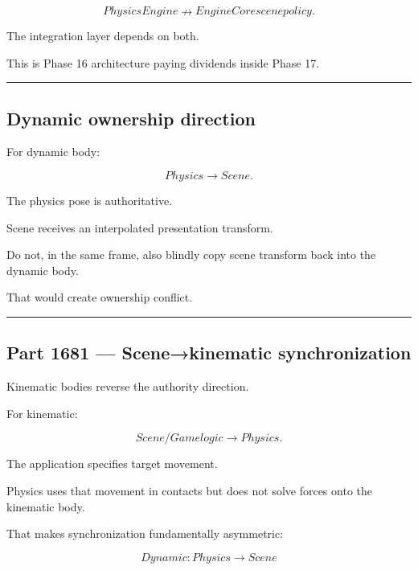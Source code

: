 \[
PhysicsEngine
\nrightarrow
EngineCore scene policy.
\]

The integration layer depends on both.

This is Phase 16 architecture paying dividends inside Phase 17.

\begin{center}\rule{0.5\linewidth}{0.5pt}\end{center}

\subsection{Dynamic ownership direction}\label{06-engine-ii-ch037-dynamic-ownership-direction}

\hypertarget{06-engine-ii-ch037-dynamic-ownership-direction}{}

For dynamic body:

\[
\boxed{
Physics\rightarrow Scene.
}
\]

The physics pose is authoritative.

Scene receives an interpolated presentation transform.

Do not, in the same frame, also blindly copy scene transform back into the dynamic body.

That would create ownership conflict.

\begin{center}\rule{0.5\linewidth}{0.5pt}\end{center}

\subsection{Part 1681 --- Scene→kinematic synchronization}\label{06-engine-ii-ch037-part-1681-scenekinematic-synchronization}

\hypertarget{06-engine-ii-ch037-part-1681-scenekinematic-synchronization}{}

Kinematic bodies reverse the authority direction.

For kinematic:

\[
\boxed{
Scene/Game logic\rightarrow Physics.
}
\]

The application specifies target movement.

Physics uses that movement in contacts but does not solve forces onto the kinematic body.

That makes synchronization fundamentally asymmetric:

\[
Dynamic:
Physics\rightarrow Scene
\]

